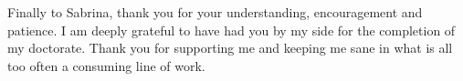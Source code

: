 \begin{acknowledgements}
  Finally to Sabrina, thank you for your understanding, encouragement and
  patience. I am deeply grateful to have had you by my side for the completion
  of my doctorate. Thank you for supporting me and keeping me sane in what is
  all too often a consuming line of work.
\end{acknowledgements}
